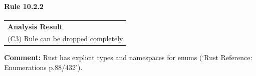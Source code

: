 \paragraph{Rule 10.2.2}
\begin{longtable}{p{13cm}}
\textbf{Analysis Result} \\
(C3) Rule can be dropped completely \\
\end{longtable}
\textbf{Comment:} Rust has explicit types and namespaces for enums (`Rust Reference: Enumerations p.88/432'). \\
